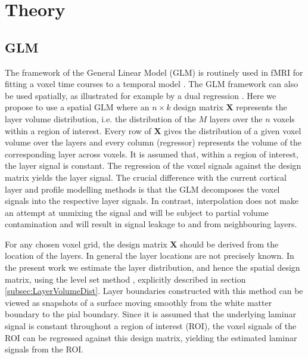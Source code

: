 \section{Theory}

\subsection{GLM}
The framework of the General Linear Model (GLM) is routinely used in fMRI for fitting a voxel time courses to a temporal model \cite{Friston1994}. The GLM framework can also be used spatially, as illustrated for example by a dual regression \cite{Beckmann2009}. Here we propose to use a spatial GLM where an $n \times k$ design matrix $\mathbf{X}$ represents the layer volume distribution, i.e. the distribution of the $M$ layers over the $n$ voxels within a region of interest. Every row of $\mathbf{X}$ gives the distribution of a given voxel volume over the layers and every column (regressor) represents the volume of the corresponding layer across voxels. It is assumed that, within a region of interest, the layer signal is constant. The regression of the voxel signals against the design matrix yields the layer signal.
The crucial difference with the current cortical layer and profile modelling methods is that the GLM decomposes the voxel signals into the respective layer signals. In contrast, interpolation does not make an attempt at unmixing the signal and will be subject to partial volume contamination and will result in signal leakage to and from neighbouring layers. 

For any chosen voxel grid, the design matrix $\mathbf{X}$ should be derived from the location of the layers. In general the layer locations are not precisely known. In the present work we estimate the layer distribution, and hence the spatial design matrix, using the level set method  \cite{Waehnert2014}, explicitly described in section \ref{subsec:LayerVolumeDist}. Layer boundaries constructed with this method can be viewed as snapshots of a surface moving smoothly from the white matter boundary to the pial boundary. Since it is assumed that the underlying laminar signal is constant throughout a region of interest (ROI), the voxel signals of the ROI can be regressed against this design matrix, yielding the estimated laminar signals from the ROI. 

